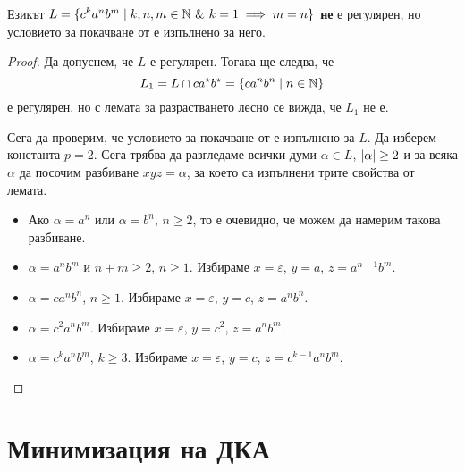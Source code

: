 \begin{example}
  Езикът $L = \{c^ka^nb^m\mid k,n,m \in \Nat\ \&\ k = 1\implies m = n\}$
  {\bf не} е регулярен, но условието за покачване от  е изпълнено за него.
\end{example}
\begin{proof}
  Да допуснем, че $L$ е регулярен.
  Тогава ще следва, че 
  \[L_1 = L\cap ca^\star b^\star = \{ca^nb^n \mid n\in\mathbb{N}\}\]
  е регулярен,
  но с лемата за разрастването лесно се вижда, че $L_1$ не е.

  Сега да проверим, че условието за покачване от  е изпълнено за $L$.
  Да изберем константа $p = 2$.
  Сега трябва да разгледаме всички думи $\alpha \in L$, $\lvert{\alpha}\rvert \geq 2$
  и за всяка $\alpha$ да посочим разбиване $xyz = \alpha$, за което са изпълнени трите свойства от лемата.

  \begin{itemize}
  \item
    Ако $\alpha = a^n$ или $\alpha = b^n$, $n\geq 2$, то е  очевидно, че можем да
    намерим такова разбиване.
  \item
    $\alpha = a^nb^m$ и $n+m \geq 2$, $n \geq 1$.
    Избираме $x = \varepsilon$, $y = a$, $z = a^{n-1}b^m$.
  \item
    $\alpha = ca^nb^n$, $n\geq 1$.
    Избираме $x = \varepsilon$, $y = c$, $z = a^nb^n$.
  \item
    $\alpha = c^2a^nb^m$. 
    Избираме $x = \varepsilon$, $y = c^2$, $z = a^nb^m$.
  \item
    $\alpha = c^ka^nb^m$, $k \geq 3$.
    Избираме $x = \varepsilon$, $y = c$, $z = c^{k-1}a^nb^m$.
  \end{itemize}
\end{proof}

\section{Минимизация на ДКА}


